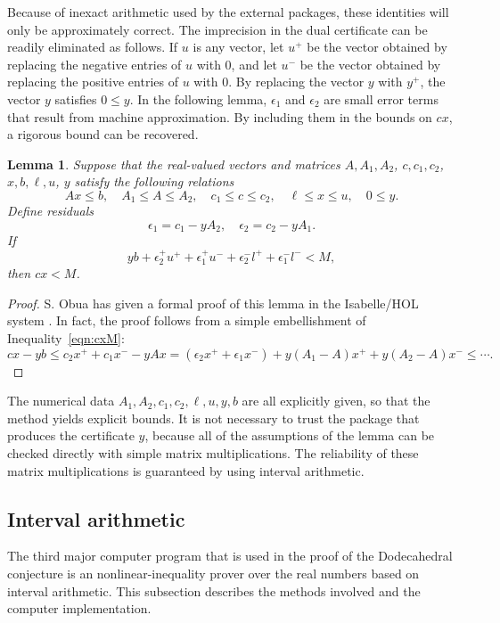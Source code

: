 \documentclass{article} %
\newtheorem{lemma}{Lemma}[subsection]
\begin{document}
Because of inexact arithmetic used by the external packages, these
identities will only be approximately correct. The imprecision in the
dual certificate can be readily eliminated as follows. If $u$ is any
vector, let $u^+$ be the vector obtained by replacing the negative
entries of $u$ with $0$, and let $u^-$ be the vector obtained by
replacing the positive entries of $u$ with $0$. By replacing the
vector $y$ with $y^+$, the vector $y$ satisfies $0\le y$. In the
following lemma, $\epsilon_1$ and $\epsilon_2$ are small error terms
that result from machine approximation. By including them in the
bounds on $c x$, a rigorous bound can be recovered.


\begin{lemma}  Suppose that the real-valued vectors and matrices
$A,A_1,A_2$, $c,c_1,c_2$, $x,b,\ell,u$, $y$ satisfy the following
relations
  $$
  A x\le b, \quad A_1 \le A \le A_2,
  \quad c_1 \le c \le c_2,\quad \ell\le x\le u,\quad
  0\le y.
  $$
Define residuals
  $$
   \epsilon_1 = c_1 - y A_2,\quad \epsilon_2 = c_2  - y A_1.
  $$
If
$$
y b + \epsilon_2^+ u^+ + \epsilon_1^+ u^- + \epsilon_2^- l^+ + \epsilon_1^- l^- < M,
$$
then $c x < M$.
\end{lemma}

\begin{proof} S. Obua has given a formal proof of this lemma in the
Isabelle/HOL system \cite[3.7.2]{Obua:2008:Thesis}. In fact, the proof
follows from a simple embellishment of Inequality~\ref{eqn:cxM}:
$$c x -y b\le c_2 x^+ + c_1 x^- -y A x= (\epsilon_2 x^+ + \epsilon_1 x^-)
  + y (A_1-A) x^+ + y (A_2 - A) x^- \le \cdots.$$
\end{proof}

The numerical data $A_1,A_2,c_1,c_2,\ell,u,y,b$ are all explicitly given,
so that the method yields explicit bounds.
It is not necessary to trust the package
that produces the certificate $y$, because
all of the assumptions of the lemma can be checked directly with
simple matrix multiplications.  The reliability of these matrix
multiplications is guaranteed by using interval arithmetic.

\subsection{Interval arithmetic}

The third major computer program that is used in the proof of
the Dodecahedral conjecture is an nonlinear-inequality prover
over the real numbers based on interval arithmetic.  
This subsection describes the
methods involved and the computer implementation.
\end{document}
